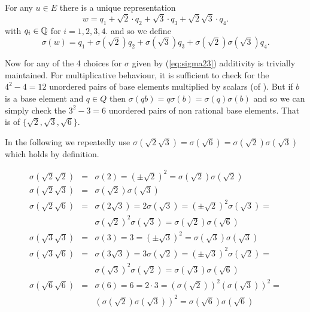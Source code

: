 \begin{myenumerate}
For any \(u\in E\) there is a unique representation
\begin{equation*}
w = q_1 + \sqrt{2}\cdot q_2 + \sqrt{3}\cdot q_3 + \sqrt{2}\sqrt{3}\cdot q_4.
\end{equation*}
with \(q_i\in \mathbb{Q}\) for \(i=1,2,3,4\).
and so we define
\begin{equation*}
\sigma(w) = q_1 + \sigma(\sqrt{2}) q_2 + \sigma(\sqrt{3}) q_3 +
                  \sigma(\sqrt{2})\sigma(\sqrt{3}) q_4.
\end{equation*}

Now for any of the 4 choices for \(\sigma\) given by (\ref{eq:sigma23})
additivity is trivially maintained.
For multiplicative behaviour,
it is sufficient to check for the \(4^2-4 = 12\) unordered pairs
of base elements multiplied by scalars (of \Q).
But if $b$ is a base element and \(q\in Q\)
then \(\sigma(qb)=q\sigma(b)=\sigma(q)\sigma(b)\)
and so we can simply check the \(3^2-3=6\) unordered pairs
of non rational base elements. That is of \(\{\sqrt{2}, \sqrt{3}, \sqrt{6}\}\).

{
 \newcommand{\sigmaof}[1]{\sigma\left(#1\right)}

In the following we repeatedly use
\(\sigmaof{\sqrt{2}\sqrt{3}} =
  \sigmaof{\sqrt{6}} =
  \sigmaof{\sqrt{2}}\sigmaof{\sqrt{3}}\)
which holds by definition.


\begin{eqnarray*}
\sigmaof{\sqrt{2}\sqrt{2}}
 & = & \sigma(2) = \left(\pm\sqrt{2}\right)^2 =
     \sigmaof{\sqrt{2}} \sigmaof{\sqrt{2}} \\
\sigmaof{\sqrt{2}\sqrt{3}}
 & = &\sigma(\sqrt{2})\sigma(\sqrt{3}) \\
\sigmaof{\sqrt{2}\sqrt{6}}
 & = & \sigmaof{2\sqrt{3}} = 2 \sigmaof{\sqrt{3}} =
       \left(\pm\sqrt{2}\right)^2\sigmaof{\sqrt{3}} = \\
 & &   \sigmaof{\sqrt{2}}^2\sigmaof{\sqrt{3}} =
       \sigmaof{\sqrt{2}}\sigmaof{\sqrt{6}} \\
\sigmaof{\sqrt{3}\sqrt{3}}
 & = & \sigma(3) = 3 = \left(\pm\sqrt{3}\right)^2 =
       \sigmaof{\sqrt{3}} \sigmaof{\sqrt{3}} \\
\sigmaof{\sqrt{3}\sqrt{6}}
  & = & \sigmaof{3\sqrt{3}} = 3 \sigmaof{\sqrt{2}} =
        \left(\pm\sqrt{3}\right)^2\sigmaof{\sqrt{2}} = \\
  & &   \sigmaof{\sqrt{3}}^2\sigmaof{\sqrt{2}} =
        \sigmaof{\sqrt{3}}\sigmaof{\sqrt{6}} \\
\sigmaof{\sqrt{6}\sqrt{6}}
 & = & \sigma(6) = 6 = 2\cdot 3 =
       \left(\sigmaof{\sqrt{2}}\right)^2 \left(\sigmaof{\sqrt{3}}\right)^2 = \\
 & &  \left(\sigmaof{\sqrt{2}} \sigmaof{\sqrt{3}}\right)^2 =
     \sigmaof{\sqrt{6}} \sigmaof{\sqrt{6}}
\end{eqnarray*}
}


\end{myenumerate}
